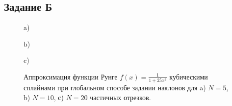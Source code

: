 \documentclass[
11pt,
master, %
subf, %
href, %
colorlinks=true, %
times, %
]{disser}
\begin{document}
\newpage
\subsection{Задание Б}
\begin{figure}[h!]
\begin{minipage}[h]{1\linewidth}
 a) \\
\end{minipage}
\vfill
\begin{minipage}[h]{1\linewidth}
 b) \\
\end{minipage}
\vfill
\begin{minipage}[h]{1\linewidth}
 c) \\
\end{minipage}
\caption{Аппроксимация функции Рунге $f(x) = \frac{1}{1 + 25 x^2}$ кубическими сплайнами при глобальном способе задании наклонов для a) $N = 5$, b) $N = 10$, с) $N = 20$ частичных отрезков.}
\label{ris:2}
\end{figure}
\end{document}
